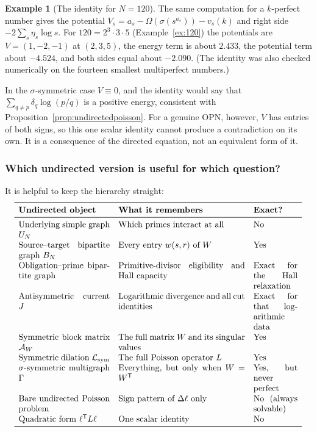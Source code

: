 \documentclass[11pt]{article}
\theoremstyle{definition}
\newtheorem{example}[theorem]{Example}
\theoremstyle{remark}
\begin{document}
\begin{example}[The identity for $N=120$]
The same computation for a $k$-perfect number gives the potential
$V_s=a_s-\Omega(\sigma(s^{a_s}))-v_s(k)$ and right side $-2\sum_s\eta_s\log s$.
For $120=2^3\cdot3\cdot5$ (Example~\ref{ex:120}) the potentials are
$V=(1,-2,-1)$ at $(2,3,5)$, the energy term is about $2.433$, the potential
term about $-4.524$, and both sides equal about $-2.090$.  (The identity was
also checked numerically on the fourteen smallest multiperfect numbers.)
\end{example}

In the $\sigma$-symmetric case $V\equiv0$, and the identity would say that
$\sum_{q\ne p}\delta_q\log(p/q)$ is a positive energy, consistent with
Proposition~\ref{prop:undirectedpoisson}.  For a genuine OPN, however, $V$
has entries of both signs, so this one scalar identity cannot produce a
contradiction on its own.  It is a consequence of the directed equation, not
an equivalent form of it.

\subsubsection{Which undirected version is useful for which question?}

It is helpful to keep the hierarchy straight:
\[
\begin{array}{p{0.31\textwidth}p{0.43\textwidth}p{0.15\textwidth}}
\toprule
\textbf{Undirected object} & \textbf{What it remembers} & \textbf{Exact?}\\
\midrule
Underlying simple graph $U_N$ & Which primes interact at all & No\\
Source--target bipartite graph $B_N$ & Every entry $w(s,r)$ of $W$ & Yes\\
Obligation--prime bipartite graph & Primitive-divisor eligibility and Hall capacity & Exact for the Hall relaxation\\
Antisymmetric current $J$ & Logarithmic divergence and all cut identities & Exact for that logarithmic data\\
Symmetric block matrix $\mathcal A_W$ & The full matrix $W$ and its singular values & Yes\\
Symmetric dilation $\mathcal L_{\mathrm{sym}}$ & The full Poisson operator $L$ & Yes\\
$\sigma$-symmetric multigraph $\Gamma$ & Everything, but only when $W=W^{\mathsf T}$ & Yes, but never perfect\\
Bare undirected Poisson problem & Sign pattern of $\Delta\ell$ only & No (always solvable)\\
Quadratic form $\ell^{\mathsf T}L\ell$ & One scalar identity & No\\
\bottomrule
\end{array}
\]
\end{document}
